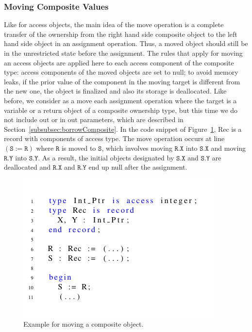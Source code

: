 \documentclass{llncs}
\newcommand\var[1]{\ensuremath{\mathtt{#1}}}
\newcommand{\keyword}[1]{\textsf{#1}}
\begin{document}
\subsubsection{Moving Composite Values}
\label{subsubsec:movingComposite}

Like for access objects, the main idea of the move operation is a complete transfer of the ownership from the right hand side composite object to the left hand
side object in an assignment operation. Thus, a moved object should still be in the unrestricted state before the assignment. The rules that apply for moving an
access objects are applied here to each access component of the composite type: access components of the moved objects are set to null; to avoid memory leaks, if the
prior value of the component in the moving target is different from the new one, the object is finalized and also its storage is deallocated.  
Like before, we consider as a move each assignment operation where the target is a variable or a return object of a composite ownership type, but this time we do not
include \keyword{out} or \keyword{in out} parameters, which are described in Section~\ref{subsubsec:borrowComposite}.
In the code snippet of Figure~\ref{fig:movingComposite}, Rec is a record with components of access type. The move operation occurs at line \var{(S := R)} where \var{R} is moved
to \var{S}, which involves moving \var{R.X} into \var{S.X} and moving \var{R.Y} into \var{S.Y}. As a result, the initial objects designated by
\var{S.X} and \var{S.Y} are deallocated and \var{R.X} and \var{R.Y} end up null after the assignment. 


\begin{figure}[htb!]
\centering
   \includegraphics[width=0.7\columnwidth]{movingComposite}
   \caption{Example for moving a composite object. }
   \label{fig:movingComposite}
\end{figure}
 
\end{document}

